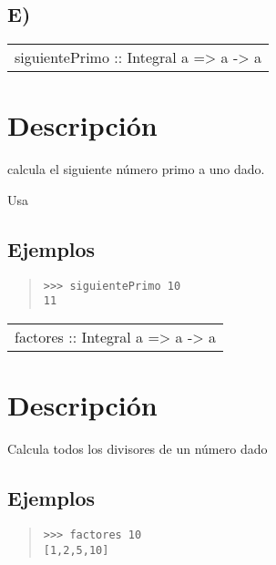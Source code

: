 \subsection{E)}
\begin{haddockdesc}
\item[\begin{tabular}{@{}l}
siguientePrimo :: Integral a => a -> a
\end{tabular}]
{\haddockbegindoc
\section*{Descripción}
calcula el siguiente número primo a uno dado.\par
Usa \par
\subsection*{Ejemplos}
\begin{quote}
{\haddockverb\begin{verbatim}
>>> siguientePrimo 10
11

\end{verbatim}}
\end{quote}}
\end{haddockdesc}
\begin{haddockdesc}
\item[\begin{tabular}{@{}l}
factores :: Integral a => a -> {\char 91}a{\char 93}
\end{tabular}]
{\haddockbegindoc
\section*{Descripción}
Calcula todos los divisores de un número dado\par
\subsection*{Ejemplos}
\begin{quote}
{\haddockverb\begin{verbatim}
>>> factores 10
[1,2,5,10]

\end{verbatim}}
\end{quote}}
\end{haddockdesc}
